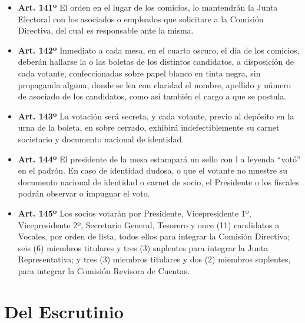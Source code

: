 \documentclass[]{book}
\providecommand{\tightlist}{%
  \setlength{\itemsep}{0pt}\setlength{\parskip}{0pt}}
\begin{document}
\begin{itemize}
\tightlist
\item
  \textbf{Art. 141º} El orden en el lugar de los comicios, lo mantendrán
  la Junta Electoral con los asociados o empleados que solicitare a la
  Comisión Directiva, del cual es responsable ante la misma.
\end{itemize}

\begin{itemize}
\tightlist
\item
  \textbf{Art. 142º} Inmediato a cada mesa, en el cuarto oscuro, el día
  de los comicios, deberán hallarse la o las boletas de los distintos
  candidatos, a disposición de cada votante, confeccionadas sobre papel
  blanco en tinta negra, sin propaganda alguna, donde se lea con
  claridad el nombre, apellido y número de asociado de los candidatos,
  como así también el cargo a que se postula.
\end{itemize}

\begin{itemize}
\tightlist
\item
  \textbf{Art. 143º} La votación será secreta, y cada votante, previo al
  depósito en la urna de la boleta, en sobre cerrado, exhibirá
  indefectiblemente su carnet societario y documento nacional de
  identidad.
\end{itemize}

\begin{itemize}
\tightlist
\item
  \textbf{Art. 144º} El presidente de la mesa estampará un sello con l a
  leyenda ``votó'' en el padrón. En caso de identidad dudosa, o que el
  votante no muestre su documento nacional de identidad o carnet de
  socio, el Presidente o los fiscales podrán observar o impugnar el
  voto.
\end{itemize}

\begin{itemize}
\tightlist
\item
  \textbf{Art. 145º} Los socios votarán por Presidente, Vicepresidente
  1º, Vicepresidente 2º, Secretario General, Tesorero y once (11)
  candidatos a Vocales, por orden de lista, todos ellos para integrar la
  Comisión Directiva; seis (6) miembros titulares y tres (3) suplentes
  para integrar la Junta Representativa; y tres (3) miembros titulares y
  dos (2) miembros suplentes, para integrar la Comisión Revisora de
  Cuentas.
\end{itemize}

\section{Del Escrutinio}\label{del-escrutinio}
\end{document}
